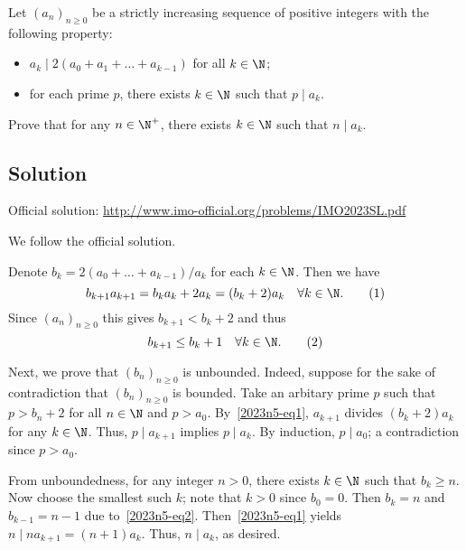 Let $(a_n)_{n \geq 0}$ be a strictly increasing sequence of positive integers with the following property:
\begin{itemize}
    \item   $a_k \mid 2(a_0 + a_1 + \ldots + a_{k - 1})$ for all $k \in \N$;
    \item   for each prime $p$, there exists $k \in \N$ such that $p \mid a_k$.
\end{itemize}

Prove that for any $n \in \N^+$, there exists $k \in \N$ such that $n \mid a_k$.



\subsection*{Solution}

Official solution: \url{http://www.imo-official.org/problems/IMO2023SL.pdf}

We follow the official solution.

Denote $b_k = 2(a_0 + \ldots + a_{k - 1})/a_k$ for each $k \in \N$.
Then we have
\[ b_{k + 1} a_{k + 1} = b_k a_k + 2 a_k = (b_k + 2) a_k \quad \forall k \in \N. \tag{1}\label{2023n5-eq1} \]
Since $(a_n)_{n \geq 0}$ this gives $b_{k + 1} < b_k + 2$ and thus
\[ b_{k + 1} \leq b_k + 1 \quad \forall k \in \N. \tag{2}\label{2023n5-eq2} \]

Next, we prove that $(b_n)_{n \geq 0}$ is unbounded.
Indeed, suppose for the sake of contradiction that $(b_n)_{n \geq 0}$ is bounded.
Take an arbitary prime $p$ such that $p > b_n + 2$ for all $n \in \N$ and $p > a_0$.
By~\eqref{2023n5-eq1}, $a_{k + 1}$ divides $(b_k + 2) a_k$ for any $k \in \N$.
Thus, $p \mid a_{k + 1}$ implies $p \mid a_k$.
By induction, $p \mid a_0$; a contradiction since $p > a_0$.

From unboundedness, for any integer $n > 0$, there exists $k \in \N$ such that $b_k \geq n$.
Now choose the smallest such $k$; note that $k > 0$ since $b_0 = 0$.
Then $b_k = n$ and $b_{k - 1} = n - 1$ due to~\eqref{2023n5-eq2}.
Then~\eqref{2023n5-eq1} yields $n \mid n a_{k + 1} = (n + 1) a_k$.
Thus, $n \mid a_k$, as desired.
